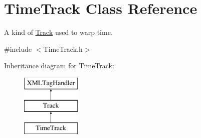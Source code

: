 \hypertarget{class_time_track}{}\section{Time\+Track Class Reference}
\label{class_time_track}


A kind of \hyperlink{class_track}{Track} used to \textquotesingle{}warp time\textquotesingle{}.  




{\ttfamily \#include $<$Time\+Track.\+h$>$}

Inheritance diagram for Time\+Track\+:\begin{figure}[H]
\begin{center}
\leavevmode
\includegraphics[height=3.000000cm]{class_time_track}
\end{center}
\end{figure}
